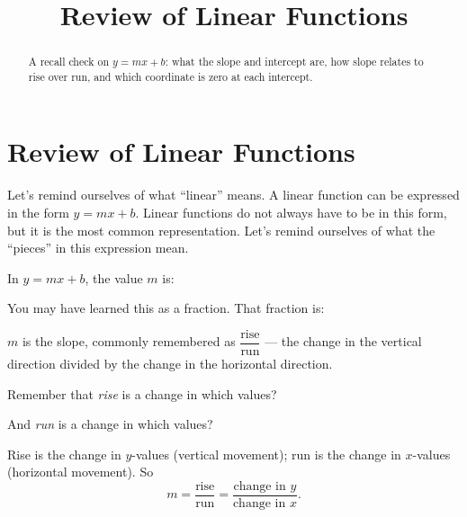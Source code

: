 \documentclass[12pt]{ximera}
\title{Review of Linear Functions}
\begin{document}
\begin{abstract}
A recall check on $y = mx + b$: what the slope and intercept are, how slope relates to
rise over run, and which coordinate is zero at each intercept.
\end{abstract}
\maketitle

\section*{Review of Linear Functions}

Let's remind ourselves of what ``linear'' means. A linear function can be expressed in
the form $y = mx + b$. Linear functions do not always have to be in this form, but it
is the most common representation. Let's remind ourselves of what the ``pieces'' in
this expression mean.

\begin{problem}
In $y = mx + b$, the value $m$ is:
\begin{multipleChoice}
\end{multipleChoice}

You may have learned this as a fraction. That fraction is:
\begin{multipleChoice}
\end{multipleChoice}

\begin{solution}
$m$ is the slope, commonly remembered as $\dfrac{\text{rise}}{\text{run}}$ --- the
change in the vertical direction divided by the change in the horizontal direction.
\end{solution}
\end{problem}

\begin{problem}
Remember that \emph{rise} is a change in which values?
\begin{multipleChoice}
\end{multipleChoice}

And \emph{run} is a change in which values?
\begin{multipleChoice}
\end{multipleChoice}

\begin{solution}
Rise is the change in $y$-values (vertical movement); run is the change in $x$-values
(horizontal movement). So
\[
m = \frac{\text{rise}}{\text{run}} = \frac{\text{change in } y}{\text{change in } x}.
\]
\end{solution}
\end{problem}
\end{document}
